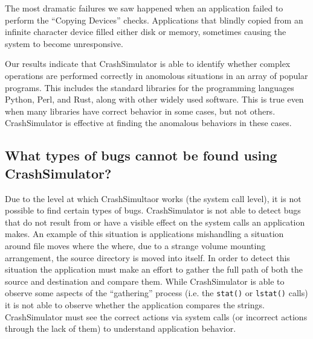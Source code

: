 The most dramatic failures we saw happened when an application failed to 
perform the ``Copying Devices'' checks.  Applications that blindly copied 
from an infinite character device filled either disk or memory, sometimes
causing the system to become unresponsive.

Our results indicate that CrashSimulator is able to identify whether complex
operations are performed correctly in anomolous situations in
an array of popular programs.  
This includes the standard libraries for the programming languages Python,
Perl, and Rust, along with other widely used software.  This is true even
when many libraries have correct behavior in some cases, but not others.
CrashSimulator is effective at finding the anomalous behaviors in these
cases.

\subsection{What types of bugs cannot be found using CrashSimulator?}
\label{sec-not-found}

Due to the level at which CrashSimultaor works (the system call level), it is
not possible to find certain types of bugs.  CrashSimulator is not able to
detect bugs that do not result from or have a visible effect on the system calls
an application makes.  An example of this situation 
is applications mishandling a situation around file moves where the
where, due to a strange volume mounting arrangement, the source directory is
moved into itself.  In order to detect this situation the application must make
an effort to gather the full path of both the source and destination and compare
them.  While CrashSimulator is able to observe some aspects of the ``gathering''
process (i.e. the {\tt stat()} or {\tt lstat()} calls) it is not able to observe
whether the application compares the strings.  
CrashSimulator must see the correct actions via system calls (or incorrect
actions through the lack of them) to understand application behavior.

